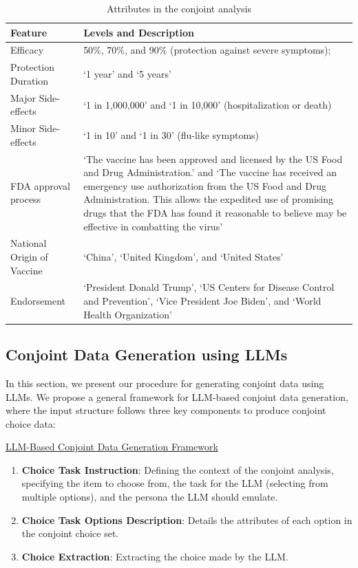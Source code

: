 \begin{table}
\renewcommand{\arraystretch}{1.5}
\centering
{\footnotesize
\caption{Attributes in the conjoint analysis}
\label{tab:attributes}
\begin{tabular}{p{45mm}p{112mm}}\hline\hline
\multicolumn{1}{l}{\textbf{Feature}}
 &  
 \multicolumn{1}{l}{\textbf{Levels and Description}}
 \\\hline
{Efficacy}     & 50\%, 70\%, and 90\% (protection against severe symptoms);                     \\\hline
{Protection Duration} & `1 year' and `5 years'
\\\hline
{Major Side-effects}  & `1 in 1,000,000' and `1 in 10,000' (hospitalization or death) 
\\\hline
{Minor Side-effects}  & `1 in 10' and `1 in 30' (flu-like symptoms)
\\\hline
{FDA approval process} & `The vaccine has been approved and licensed by the US Food and Drug Administration.' and `The vaccine has received an emergency use authorization from the US Food and Drug Administration.  This allows the expedited use of promising drugs that the FDA has found it reasonable to believe may be effective in combatting the virus'
\\\hline
{National Origin of Vaccine} &`China', `United Kingdom', and `United States'
\\\hline
{Endorsement} & `President Donald Trump', `US Centers for Disease Control and Prevention', `Vice President Joe Biden', and `World Health Organization'
\\\hline
\hline
\end{tabular}
}
\end{table}

\subsection{Conjoint Data Generation using LLMs}
\label{subsec:data-generation}
In this section, we present our procedure for generating conjoint data using LLMs. We propose a general framework for LLM-based conjoint data generation, where the input structure follows three key components to produce conjoint choice data:

\vspace{10pt}

\begin{mdframed} \footnotesize \underline{{\sc LLM-Based Conjoint Data Generation Framework}} 
\begin{enumerate} 
\item[(I)] \textbf{\textbf{Choice Task Instruction}}: Defining the context of the conjoint analysis, specifying the item to choose from, the task for the LLM (selecting from multiple options), and the persona the LLM should emulate. 
\item[(II)] \textbf{\textbf{Choice Task Options Description}}: Details the attributes of each option in the conjoint choice set. 
\item[(III)] \textbf{\textbf{Choice Extraction}}: Extracting the choice made by the LLM. \end{enumerate} 
\end{mdframed}


